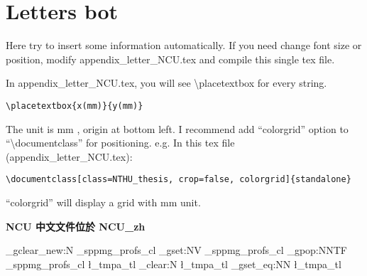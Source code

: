 \documentclass[class=NTHU_thesis, crop=false]{standalone}
\begin{document}
\chapter{Letters bot}

Here try to insert some information automatically.
If you need change font size or position, modify appendix\_letter\_NCU.tex and compile this single tex file.

In appendix\_letter\_NCU.tex, you will see \textbackslash{}placetextbox for every string.
\begin{lstlisting}[style=LatexStyle,caption={}]
\placetextbox{x(mm)}{y(mm)}
\end{lstlisting}

The unit is mm , origin at bottom left. I recommend add ``colorgrid'' option to ``\textbackslash{}documentclass'' for positioning. e.g. In this tex file (appendix\_letter\_NCU.tex):

\begin{lstlisting}[style=LatexStyle,caption={}]
\documentclass[class=NTHU_thesis, crop=false, colorgrid]{standalone}
\end{lstlisting}

``colorgrid'' will display a grid with mm unit. 

\begin{center}
{ \noindent\color{red}\bfseries\Large NCU 中文文件位於 NCU\_zh}
\end{center}

\ExplSyntaxOn
    \clist_gclear_new:N \g_sppmg_profs_cl
    \clist_gset:NV \g_sppmg_profs_cl \profs
    \clist_gpop:NNTF \g_sppmg_profs_cl \l_tmpa_tl {}{ \tl_clear:N \l_tmpa_tl}
    \cs_gset_eq:NN \mprof \l_tmpa_tl
\ExplSyntaxOff

\def\title{\titleEn}

\cleardoublepage
\pagestyle{empty}
\sffamily


\end{document}
